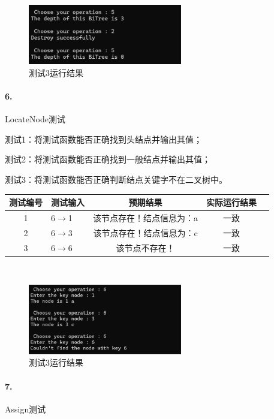 \documentclass[supercite]{Experimental_Report}
\theoremstyle{definition}
\begin{document}
~\

\begin{figure}[H]
 	\centering
 	\includegraphics[width=0.6\textwidth]{images/二叉树测试5.png}
 	\caption{测试3运行结果}
 	\label{txlab}
 \end{figure}

\paragraph{ 6.}LocateNode测试 

测试1：将测试函数能否正确找到头结点并输出其值；

测试2：将测试函数能否正确找到一般结点并输出其值；

测试3：将测试函数能否正确判断结点关键字不在二叉树中。

\vspace{0.5em}

\begin{tabular}{|c|l|c|c|c|}
	\hline
	测试编号 & 测试输入 & 预期结果 & 实际运行结果 \\
	\hline
	1 & 6$\rightarrow$1 & 该节点存在！结点信息为：a & 一致 \\
	\hline
	2 & 6$\rightarrow$3 & 该节点存在！结点信息为：c & 一致 \\
	\hline
	3 & 6$\rightarrow$6 & 该节点不存在！ & 一致 \\
	\hline
\end{tabular}

~\

\begin{figure}[H]
 	\centering
 	\includegraphics[width=0.6\textwidth]{images/二叉树测试6.png}
 	\caption{测试3运行结果}
 	\label{txlab}
 \end{figure}

\paragraph{ 7.}Assign测试
\end{document}
